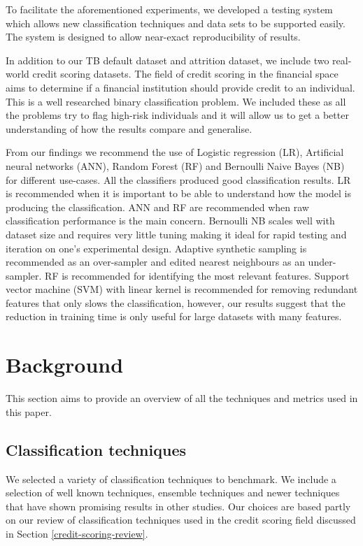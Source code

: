\documentclass{sig-alternate-05-2015}
\begin{document}
	To facilitate the aforementioned experiments, we developed a testing system which allows new classification techniques and data sets to be supported easily. The system is designed to allow near-exact reproducibility of results.
	
	In addition to our TB default dataset and attrition dataset, we include two real-world credit scoring datasets. The field of credit scoring in the financial space aims to determine if a financial institution should provide credit to an individual. This is a well researched binary classification problem. We included these as all the problems try to flag high-risk individuals and it will allow us to get a better understanding of how the results compare and generalise.
	
	From our findings we recommend the use of Logistic regression (LR), Artificial neural networks (ANN), Random Forest (RF) and Bernoulli Naive Bayes (NB) for different use-cases. All the classifiers produced good classification results. LR is recommended when it is important to be able to understand how the model is producing the classification. ANN and RF are recommended when raw classification performance is the main concern. Bernoulli NB scales well with dataset size and requires very little tuning making it ideal for rapid testing and iteration on one's experimental design. Adaptive synthetic sampling is recommended as an over-sampler and edited nearest neighbours as an under-sampler. RF is recommended for identifying the most relevant features. Support vector machine (SVM) with linear kernel is recommended for removing redundant features that only slows the classification, however, our results suggest that the reduction in training time is only useful for large datasets with many features.
	
	\section{Background}
	This section aims to provide an overview of all the techniques and metrics used in this paper.
	
	\subsection{Classification techniques}
	We selected a variety of classification techniques to benchmark. We include a selection of well known techniques, ensemble techniques and newer techniques that have shown promising results in other studies. Our choices are based partly on our review of classification techniques used in the credit scoring field discussed in Section \ref{credit-scoring-review}.
\end{document}
